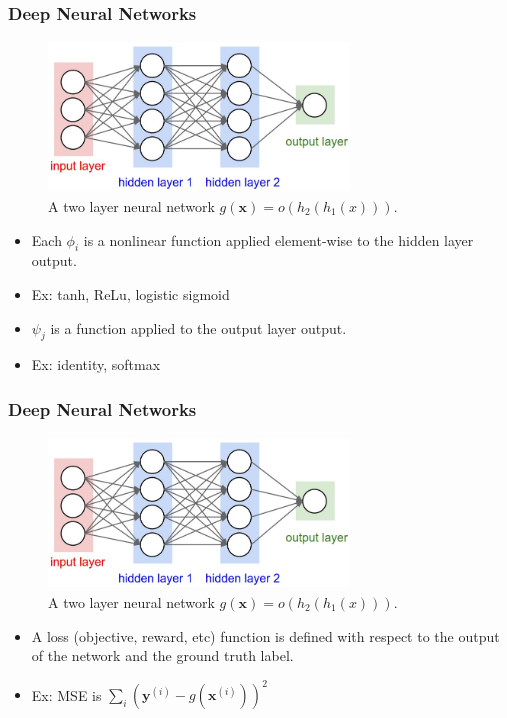 \documentclass{beamer}
\begin{document}
\begin{frame}
\frametitle{Deep Neural Networks}
\begin{figure}
	\begin{center}
		\includegraphics[width=8cm, height=4cm]{dnn}
	\end{center}
	\caption{A two layer neural network $g(\textbf{x}) = o(h_2(h_1(x)))$.}
\end{figure}
\begin{itemize}
	\item Each $\phi_i$ is a nonlinear function applied element-wise to the hidden layer output.
	\item Ex: tanh, ReLu, logistic sigmoid
	\item $\psi_j$ is a function applied to the output layer output.
	\item Ex: identity, softmax
\end{itemize}
\end{frame}

\begin{frame}
\frametitle{Deep Neural Networks}
\begin{figure}
	\begin{center}
		\includegraphics[width=8cm, height=4cm]{dnn}
	\end{center}
	\caption{A two layer neural network $g(\textbf{x}) = o(h_2(h_1(x)))$.}
\end{figure}
\begin{itemize}
	\item A loss (objective, reward, etc) function is defined with respect to the output of the network and the ground truth label.
	\item Ex: MSE is $\sum_i (\textbf{y}^{(i)} - g(\textbf{x}^{(i)}))^2$
\end{itemize}
\end{frame}
\end{document}
